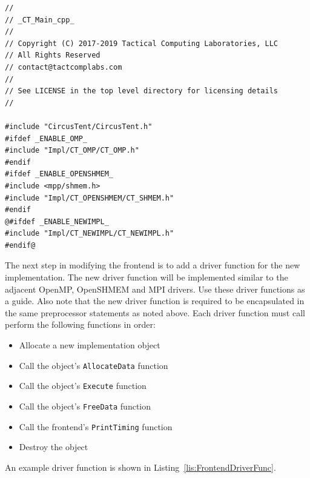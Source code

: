 \documentclass{article}
\begin{document}
\vspace{0.125in}
\begin{lstlisting}[frame=single,style=base,caption={Frontend Header Modifications},captionpos=b,label={lis:FrontendHeaderMods}]
//
// _CT_Main_cpp_
//
// Copyright (C) 2017-2019 Tactical Computing Laboratories, LLC
// All Rights Reserved
// contact@tactcomplabs.com
//
// See LICENSE in the top level directory for licensing details
//

#include "CircusTent/CircusTent.h"
#ifdef _ENABLE_OMP_
#include "Impl/CT_OMP/CT_OMP.h"
#endif
#ifdef _ENABLE_OPENSHMEM_
#include <mpp/shmem.h>
#include "Impl/CT_OPENSHMEM/CT_SHMEM.h"
#endif
@#ifdef _ENABLE_NEWIMPL_
#include "Impl/CT_NEWIMPL/CT_NEWIMPL.h"
#endif@
\end{lstlisting}

The next step in modifying the frontend is to add a driver function 
for the new implementation.  The new driver function will be implemented 
similar to the adjacent OpenMP, OpenSHMEM and MPI drivers.  Use these 
driver functions as a guide.  Also note that the new driver function is required 
to be encapsulated in the same preprocessor statements as noted above.    
Each driver function must call perform the following functions in order:

\begin{itemize}
\item Allocate a new implementation object
\item Call the object's \texttt{AllocateData} function
\item Call the object's \texttt{Execute} function
\item Call the object's \texttt{FreeData} function
\item Call the frontend's \texttt{PrintTiming} function
\item Destroy the object
\end{itemize}

An example driver function is shown in Listing~\ref{lis:FrontendDriverFunc}.  
\end{document}
